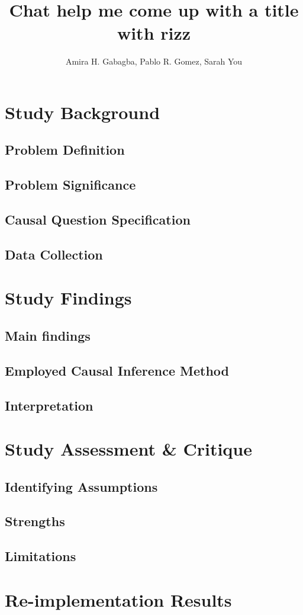 \documentclass[letterpaper]{article}
\title{Chat help me come up with a title with rizz}
\author{Amira H. Gabagba, Pablo R. Gomez, Sarah You}
\begin{document}
\maketitle
\section{Study Background}
    \subsection{Problem Definition}
    \subsection{Problem Significance}
    \subsection{Causal Question Specification}
    \subsection{Data Collection}
\section{Study Findings}
    \subsection{Main findings}
    \subsection{Employed Causal Inference Method}
    \subsection{Interpretation}
\section{Study Assessment \& Critique}
    \subsection{Identifying Assumptions}
    \subsection{Strengths}
    \subsection{Limitations}
\section{Re-implementation Results}
\end{document}
